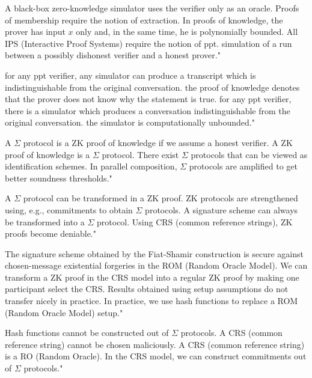 {A black-box zero-knowledge simulator uses the verifier only as an oracle.}
{Proofs of membership require the notion of extraction.}
{In proofs of knowledge, the prover has input $x$ only and, in the same time, he is polynomially bounded.}
{All IPS (Interactive Proof Systems) require the notion of ppt. simulation of a run between a possibly dishonest verifier and a honest prover."}

{for any ppt verifier, any simulator can produce a transcript which is indistinguishable from the original conversation.}
{the proof of knowledge denotes that the prover does not know why the statement is true.}
{for any ppt verifier, there is a simulator which produces a conversation indistinguishable from the original conversation.}
{the simulator is computationally unbounded."}

{A $\Sigma$ protocol is a ZK proof of knowledge if we assume a honest verifier.}
{A ZK proof of knowledge is a $\Sigma$ protocol.}
{There exist $\Sigma$ protocols that can be viewed as identification schemes.}
{In parallel composition, $\Sigma$ protocols are amplified to get better soundness thresholds."}

{A $\Sigma$ protocol can be transformed in a ZK proof.}
{ZK protocols are strengthened using, e.g., commitments to obtain $\Sigma$ protocols.}
{A signature scheme can always be transformed into a $\Sigma$ protocol.}
{Using CRS (common reference strings), ZK proofs become deniable."}

{The signature scheme obtained by the Fiat-Shamir construction is secure against chosen-message existential forgeries in the ROM (Random Oracle Model).}
{We can transform a ZK proof in the CRS model into a regular ZK proof by making one participant select the CRS.}
{Results obtained using setup assumptions do not transfer nicely in practice.}
{In practice, we use hash functions to replace a ROM (Random Oracle Model) setup."}

{Hash functions cannot be constructed out of $\Sigma$ protocols.}
{A CRS (common reference string) cannot be chosen maliciously.}
{A CRS (common reference string) is a RO (Random Oracle).}
{In the CRS model, we can construct commitments out of $\Sigma$ protocols."}

